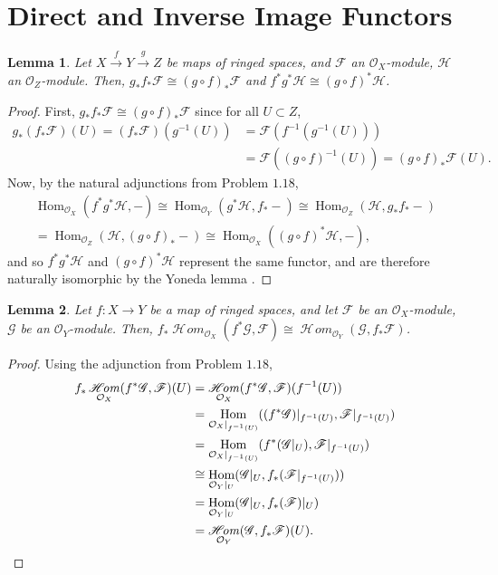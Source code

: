 \documentclass[12pt,letterpaper]{article}
\newtheorem{lemma}{Lemma}[section]
\theoremstyle{definition}
\theoremstyle{remark}
\numberwithin{equation}{section}
\numberwithin{figure}{problem}
\DeclareMathOperator{\Hom}{Hom}
\newcommand{\FF}{\mathscr{F}}
\newcommand{\GG}{\mathscr{G}}
\newcommand{\HH}{\mathscr{H}}
\newcommand{\OO}{\mathcal{O}}
\DeclareMathOperator{\HHom}{\mathscr{H}\!\mathit{om}}
\begin{document}
\section{Direct and Inverse Image Functors}
\begin{lemma}\label{invimgcomp}
  Let $X \overset{f}{\to} Y \overset{g}{\to} Z$ be maps of ringed spaces, and $\FF$ an $\OO_X$-module, $\HH$ an $\OO_Z$-module. Then, $g_*f_*\FF \cong (g \circ f)_*\FF$ and $f^*g^*\HH \cong (g \circ f)^*\HH$.
\end{lemma}
\begin{proof}
  First, $g_*f_*\FF \cong (g \circ f)_*\FF$ since for all $U \subset Z$,
  \begin{align*}
    g_*(f_*\FF)(U) = (f_*\FF)(g^{-1}(U)) &= \FF(f^{-1}(g^{-1}(U)))\\
    &= \FF((g \circ f)^{-1}(U)) = (g \circ f)_*\FF(U).
  \end{align*}
  Now, by the natural adjunctions from Problem $1.18$,
  \begin{multline*}
    \Hom_{\OO_X}(f^*g^*\HH,-) \cong \Hom_{\OO_Y}(g^*\HH,f_*-) \cong \Hom_{\OO_Z}(\HH,g_*f_*-)\\
    = \Hom_{\OO_Z}(\HH,(g \circ f)_*-) \cong \Hom_{\OO_X}((g \circ f)^*\HH,-),
  \end{multline*}
  and so $f^*g^*\HH$ and $(g \circ f)^*\HH$ represent the same functor, and are therefore naturally isomorphic by the Yoneda lemma \cite[p.~61]{Mac98}.
\end{proof}
\begin{lemma}\label{pfhom}
  Let $f\colon X \to Y$ be a map of ringed spaces, and let $\FF$ be an $\OO_X$-module, $\GG$ be an $\OO_Y$-module. Then, $f_*\HHom_{\OO_X}(f^*\GG,\FF) \cong \HHom_{\OO_Y}(\GG,f_*\FF)$.
\end{lemma}
\begin{proof}
  Using the adjunction from Problem $1.18$,
  \begin{align*}
    f_*\HHom_{\OO_X}(f^*\GG,\FF)(U) &= \HHom_{\OO_X}(f^*\GG,\FF)(f^{-1}(U))\\
    &= \Hom_{\OO_X\vert_{f^{-1}(U)}}((f^*\GG)\vert_{f^{-1}(U)},\FF\vert_{f^{-1}(U)})\\
    &= \Hom_{\OO_X\vert_{f^{-1}(U)}}(f^*(\GG\vert_U),\FF\vert_{f^{-1}(U)})\\
    &\cong \Hom_{\OO_Y\vert_{U}}(\GG\vert_U,f_*(\FF\vert_{f^{-1}(U)}))\\
    &= \Hom_{\OO_Y\vert_{U}}(\GG\vert_U,f_*(\FF)\vert_U)\\
    &= \HHom_{\OO_Y}(\GG,f_*\FF)(U).\qedhere
  \end{align*}
\end{proof}
\end{document}
